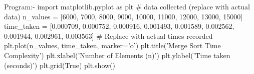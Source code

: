 Program:- 
import matplotlib.pyplot as plt 
# data collected (replace with actual data) 
n_values = [6000, 7000, 8000, 9000, 10000, 11000, 12000, 13000, 15000] 
time_taken = [0.000709, 0.000752, 0.000916, 0.001493, 0.001589, 0.002562, 0.001944, 0.002961, 
0.003563]  
# Replace with actual times recorded 
plt.plot(n_values, time_taken, marker='o') 
plt.title('Merge Sort Time Complexity') 
plt.xlabel('Number of Elements (n)') 
plt.ylabel('Time taken (seconds)') 
plt.grid(True) 
plt.show() 
